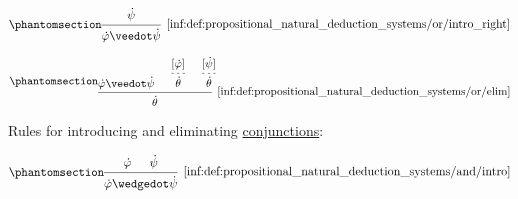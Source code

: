 \begin{definition}
\begin{thmenum}
\begin{paracol}{3}
      \begin{nthcolumn}{1}
        \ParacolAlignmentHack
        \begin{equation*}\taglabel[\ensuremath{ \vee_{+R} }]{inf:def:propositional_natural_deduction_systems/or/intro_right}
          \begin{prooftree}
            \hypo{ \syn\psi }
            \infer1[\ref{inf:def:propositional_natural_deduction_systems/or/intro_right}]{ \syn\varphi \synvee \syn\psi }
          \end{prooftree}
        \end{equation*}
      \end{nthcolumn}

      \begin{nthcolumn}{2}
        \ParacolAlignmentHack
        \begin{equation*}\taglabel[\ensuremath{ \vee_- }]{inf:def:propositional_natural_deduction_systems/or/elim}
          \begin{prooftree}
            \hypo{ \syn\varphi \synvee \syn\psi }

            \hypo{ [\syn\varphi] }
            \infer[dashed]1{ \syn\theta }

            \hypo{ [\syn\psi] }
            \infer[dashed]1{ \syn\theta }

            \infer3[\ref{inf:def:propositional_natural_deduction_systems/or/elim}]{ \syn\theta }
          \end{prooftree}
        \end{equation*}
      \end{nthcolumn}
    \end{paracol}

     Rules for introducing and eliminating \hyperref[def:propositional_alphabet/connectives/conjunction]{conjunctions}:
    \begin{paracol}{3}
      \begin{nthcolumn}{0}
        \ParacolAlignmentHack
        \begin{equation*}\taglabel[\ensuremath{ \wedge_+ }]{inf:def:propositional_natural_deduction_systems/and/intro}
          \begin{prooftree}
            \hypo{ \syn\varphi }
            \hypo{ \syn\psi }
            \infer2[\ref{inf:def:propositional_natural_deduction_systems/and/intro}]{ \syn\varphi \synwedge \syn\psi }
          \end{prooftree}
        \end{equation*}
      \end{nthcolumn}


\end{paracol}
\end{thmenum}
\end{definition}
